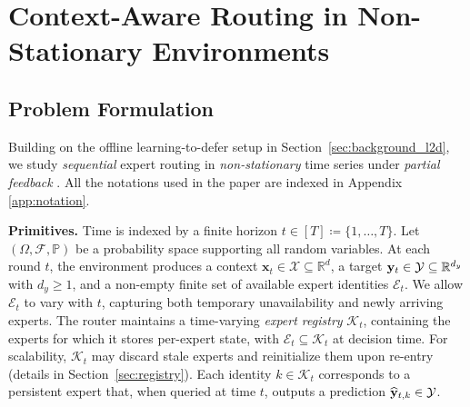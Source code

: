 \section{Context-Aware Routing in Non-Stationary Environments}

\subsection{Problem Formulation}
\label{sec:problem_formulation}

Building on the offline learning-to-defer setup in Section~\ref{sec:background_l2d}, we study
\emph{sequential} expert routing in \emph{non-stationary} time series under \emph{partial
feedback} \citep{neu2010online, dani2008stochastic}. All the notations used in the paper are indexed in Appendix \ref{app:notation}. 

\textbf{Primitives.}
Time is indexed by a finite horizon \(t\in[T]\coloneqq\{1,\dots,T\}\). Let
\((\Omega,\mathcal{F},\mathbb{P})\) be a probability space supporting all random variables. At each
round \(t\), the environment produces a context \(\mathbf{x}_t\in\mathcal{X}\subseteq\mathbb{R}^d\), a
target \(\mathbf{y}_t\in\mathcal{Y}\subseteq\mathbb{R}^{d_y}\) with \(d_y\ge 1\), and a non-empty finite set
of available expert identities \(\mathcal{E}_t\). We allow \(\mathcal{E}_t\) to vary with \(t\),
capturing both temporary unavailability and newly arriving experts.
The router maintains a time-varying \emph{expert registry} \(\mathcal{K}_t\), containing the experts
for which it stores per-expert state, with \(\mathcal{E}_t\subseteq \mathcal{K}_t\) at decision time.
For scalability, \(\mathcal{K}_t\) may discard stale experts and reinitialize them upon re-entry
(details in Section~\ref{sec:registry}).
Each identity \(k\in\mathcal{K}_t\) corresponds to a persistent expert that, when queried at time \(t\),
outputs a prediction \(\widehat{\mathbf{y}}_{t,k}\in\mathcal{Y}\).

